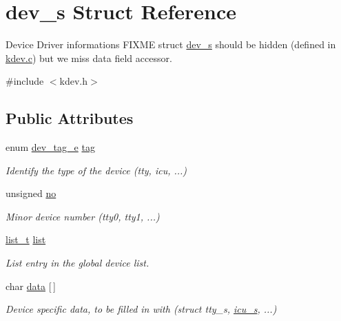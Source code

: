 \hypertarget{structdev__s}{\section{dev\-\_\-s Struct Reference}
\label{structdev__s}
}


Device Driver informations F\-I\-X\-M\-E struct \hyperlink{structdev__s}{dev\-\_\-s} should be hidden (defined in \hyperlink{kdev_8c}{kdev.\-c}) but we miss data field accessor.  




{\ttfamily \#include $<$kdev.\-h$>$}

\subsection*{Public Attributes}
\begin{DoxyCompactItemize}
\item 
enum \hyperlink{kdev_8h_a13c83819eabea78dd368dd60d38f5c8d}{dev\-\_\-tag\-\_\-e} \hyperlink{structdev__s_addb9b18666e781df02b2a7f2c8889b2b}{tag}
\begin{DoxyCompactList}\small\item\em Identify the type of the device (tty, icu, ...) \end{DoxyCompactList}\item 
unsigned \hyperlink{structdev__s_aa9bb06b8905eac21cced3a03f91d4f15}{no}
\begin{DoxyCompactList}\small\item\em Minor device number (tty0, tty1, ...) \end{DoxyCompactList}\item 
\hyperlink{list_8h_ad3b2684139c847cd572cb7b9679ce227}{list\-\_\-t} \hyperlink{structdev__s_a4fdb485fdfb2cfdf956289636560a9ff}{list}
\begin{DoxyCompactList}\small\item\em List entry in the global device list. \end{DoxyCompactList}\item 
char \hyperlink{structdev__s_a77c17663043315d33ca8e0e6d420c475}{data} \mbox{[}$\,$\mbox{]}
\begin{DoxyCompactList}\small\item\em Device specific data, to be filled in with (struct tty\-\_\-s, \hyperlink{structicu__s}{icu\-\_\-s}, ...) \end{DoxyCompactList}\end{DoxyCompactItemize}


